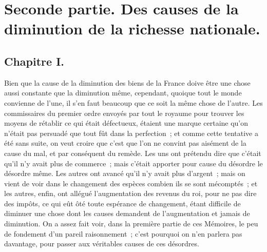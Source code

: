 \documentclass[french,twoside]{book} %
\begin{document}
\section[{Seconde partie. Des causes de la diminution de la richesse nationale.}]{Seconde partie. Des causes de la diminution de la richesse nationale.}
\subsection[{Chapitre I.}]{Chapitre I.}
\noindent Bien que la cause de la diminution des biens de la France doive être une chose aussi constante que la diminution même, cependant, quoique tout le monde convienne de l’une, il s’en faut beaucoup que ce soit la même chose de l’autre. Les commissaires du premier ordre envoyés par tout le royaume pour trouver les moyens de rétablir ce qui était défectueux, étaient une marque certaine qu’on n’était pas persuadé que tout fût dans la perfection ; et comme cette tentative a été sans suite, on veut croire que c’est que l’on ne convint pas aisément de la cause du mal, et par conséquent du remède. Les uns ont prétendu dire que c’était qu’il n’y avait plus de commerce ; mais c’était apporter pour cause du désordre le désordre même. Les autres ont avancé qu’il n’y avait plus d’argent ; mais on vient de voir dans le changement des espèces combien ils se sont mécomptés ; et les autres, enfin, ont allégué l’augmentation des revenus du roi, pour ne pas dire des impôts, ce qui eût ôté toute espérance de changement, étant difficile de diminuer une chose dont les causes demandent de l’augmentation et jamais de diminution. On a assez fait voir, dans la première partie de ces Mémoires, le peu de fondement d’un pareil raisonnement ; c’est pourquoi on n’en parlera pas davantage, pour passer aux véritables causes de ces désordres.
\end{document}
